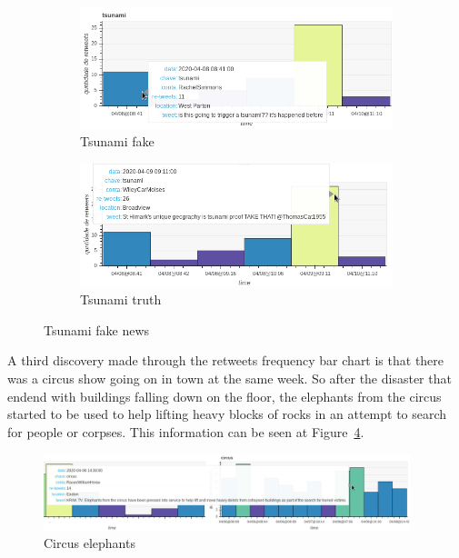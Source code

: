 \begin{figure}[!h]
    \centering
    \begin{subfigure}[!h]{0.47\textwidth}
        \centering
        \includegraphics[width=1.00\textwidth]{figs/q3/re_tsunami_fake.png}
        \caption{Tsunami fake}
        \label{fig:re_tsunami_fake}
    \end{subfigure}
    \begin{subfigure}[!h]{0.47\textwidth}
        \centering
        \includegraphics[width=1.00\textwidth]{figs/q3/re_tsunami_truth.png}
        \caption{Tsunami truth}
        \label{fig:re_tsunami_truth}
    \end{subfigure}
    \caption{Tsunami fake news}
    \label{fig:re_tsunami}
\end{figure}

A third discovery made through the retweets frequency bar chart is that there
was a circus show going on in town at the same week. So after the disaster
that endend with buildings falling down on the floor, the elephants from the
circus started to be used to help lifting heavy blocks of rocks in an attempt to
search for people or corpses. This information can be seen at
Figure~\ref{fig:re_circus}.

\begin{figure}[!h]
    \centering
    \includegraphics[width=0.95\textwidth]{figs/q3/re_circus.png}
    \caption{Circus elephants}
    \label{fig:re_circus}
\end{figure}
